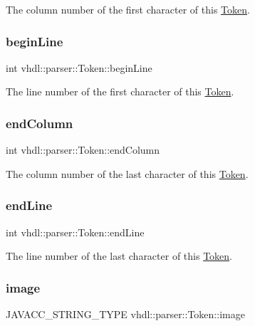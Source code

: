 The column number of the first character of this \mbox{\hyperlink{classvhdl_1_1parser_1_1_token}{Token}}. \mbox{\label{classvhdl_1_1parser_1_1_token_a7fdeaf5cb35f8a5ecab251ddcd4b5909}} 
\subsubsection{\texorpdfstring{beginLine}{beginLine}}
{\footnotesize\ttfamily int vhdl\+::parser\+::\+Token\+::begin\+Line}

The line number of the first character of this \mbox{\hyperlink{classvhdl_1_1parser_1_1_token}{Token}}. \mbox{\label{classvhdl_1_1parser_1_1_token_ac61778db323adf6f0b89f9eed2b672cf}} 
\subsubsection{\texorpdfstring{endColumn}{endColumn}}
{\footnotesize\ttfamily int vhdl\+::parser\+::\+Token\+::end\+Column}

The column number of the last character of this \mbox{\hyperlink{classvhdl_1_1parser_1_1_token}{Token}}. \mbox{\label{classvhdl_1_1parser_1_1_token_ae891f2c047fc387a551a1ef49036a685}} 
\subsubsection{\texorpdfstring{endLine}{endLine}}
{\footnotesize\ttfamily int vhdl\+::parser\+::\+Token\+::end\+Line}

The line number of the last character of this \mbox{\hyperlink{classvhdl_1_1parser_1_1_token}{Token}}. \mbox{\label{classvhdl_1_1parser_1_1_token_abafca7a99f0aca2f76d1d9094bf22e9c}} 
\subsubsection{\texorpdfstring{image}{image}}
{\footnotesize\ttfamily J\+A\+V\+A\+C\+C\+\_\+\+S\+T\+R\+I\+N\+G\+\_\+\+T\+Y\+PE vhdl\+::parser\+::\+Token\+::image}

